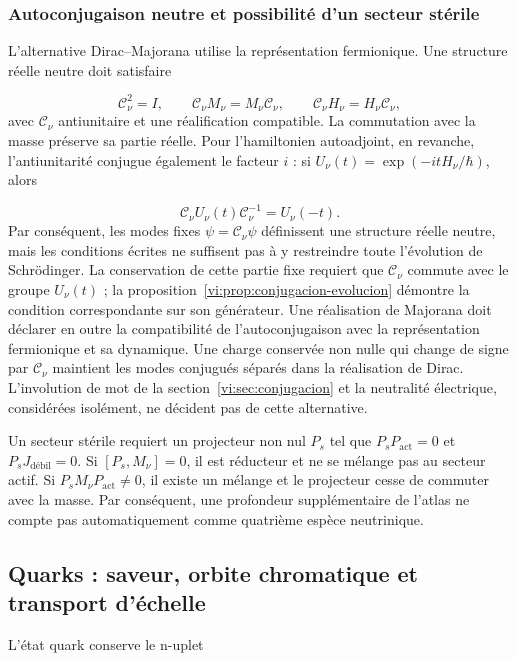 \subsubsection{Autoconjugaison neutre et possibilité d’un secteur stérile
}

L’alternative Dirac--Majorana utilise la représentation fermionique. Une
structure réelle neutre doit satisfaire

\[
 \mathcal C_\nu^2=I,\qquad
 \mathcal C_\nu M_\nu=M_\nu\mathcal C_\nu,\qquad
 \mathcal C_\nu H_\nu=H_\nu\mathcal C_\nu,
\]
avec \(\mathcal C_\nu\) antiunitaire et une réalification compatible.
La commutation avec la masse préserve sa partie réelle. Pour l’hamiltonien
autoadjoint, en revanche, l’antiunitarité conjugue également le facteur
\(i\) : si \(U_\nu(t)=\exp(-itH_\nu/\hbar)\), alors

\[
 \mathcal C_\nu U_\nu(t)\mathcal C_\nu^{-1}=U_\nu(-t).
\]
Par conséquent, les modes fixes \(\psi=\mathcal C_\nu\psi\) définissent une
structure réelle neutre, mais les conditions écrites ne suffisent pas à
y restreindre toute l’évolution de Schr\"odinger. La conservation de
cette partie fixe requiert que \(\mathcal C_\nu\) commute avec le groupe
\(U_\nu(t)\) ; la proposition~\ref{vi:prop:conjugacion-evolucion}
démontre la condition correspondante sur son générateur. Une
réalisation de Majorana doit déclarer en outre la compatibilité de
l’autoconjugaison avec la représentation fermionique et sa dynamique.
Une charge conservée non nulle qui change
de signe par \(\mathcal C_\nu\) maintient les modes conjugués séparés
dans la réalisation de Dirac. L’involution de mot de la
section~\ref{vi:sec:conjugacion} et la neutralité électrique, considérées
isolément, ne décident pas de cette alternative.


Un secteur stérile requiert un projecteur non nul \(P_s\) tel que
\(P_sP_{\mathrm{act}}=0\) et \(P_sJ_{\mathrm{débil}}=0\).
Si \([P_s,M_\nu]=0\), il est réducteur et ne se mélange pas au secteur actif.
Si \(P_sM_\nu P_{\mathrm{act}}\ne0\), il existe un mélange et le projecteur
cesse de commuter avec la masse. Par conséquent, une profondeur supplémentaire de
l’atlas ne compte pas automatiquement comme quatrième espèce neutrinique.


\subsection{Quarks : saveur, orbite chromatique et transport d’échelle
}
\label{vi:subsec:quarks-familias}

L’état quark conserve le n-uplet

